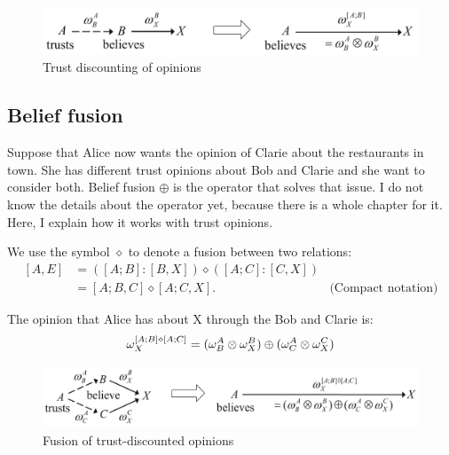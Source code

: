\documentclass[a4paper,12pt]{article}
\theoremstyle{definition}
\numberwithin{equation}{section}
\begin{document}
\begin{figure}[htb]
	\centering
	\includegraphics[scale=0.3]{images/trust-discounting-of-opinions.png}
	\caption{Trust discounting of opinions}
\end{figure}

\subsection{Belief fusion}

Suppose that Alice now wants the opinion of Clarie about the restaurants in town. She has different trust opinions about Bob and Clarie and she want to consider both. Belief fusion $\oplus$ is the operator that solves that issue. I do not know the details about the operator yet, because there is a whole chapter for it. Here, I explain how it works with trust opinions.

We use the symbol $\diamond$ to denote a fusion between two relations:
\begin{equation}
	\begin{array}{rll}
		[A,E] & = ([A; B] : [B, X]) \diamond([A; C] : [C, X]) \\
		& = [A; B, C] \diamond [A; C, X] \text{.} & \text{(Compact notation)} 
	\end{array}
\end{equation}

The opinion that Alice has about X through the Bob and Clarie is:
\begin{equation}
	\omega^{[A; B] \diamond [A; C]}_{X} = (\omega^{A}_{B} \otimes \omega^{B}_{X}) \oplus (\omega^{A}_{C} \otimes \omega^{C}_{X})
\end{equation}

\begin{figure}[htb]
	\centering
	\includegraphics[scale=0.32]{images/fusion-of-trust-discounted-opinions.png}
	\caption{Fusion of trust-discounted opinions}
\end{figure}

%
%	
%	
\end{document}
